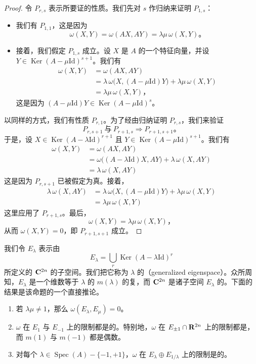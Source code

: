 \begin{proof}
令 $P_{r,s}$ 表示所要证的性质。我们先对 $s$ 作归纳来证明 $P_{1,s}$：
\begin{itemize}
\item 我们有 $P_{1,1}$，这是因为
\[
\omega(X,Y)=\omega(AX,AY)=\lambda\mu\,\omega(X,Y)\text{。}
\]
\item 接着，我们假定 $P_{1,s}$ 成立。设 $X$ 是 $A$ 的一个特征向量，并设 $Y\in\operatorname{Ker}(A-\mu\mathrm{Id})^{s+1}$。我们有
\[
\begin{aligned}
\omega(X,Y)&=\omega(AX,AY)\\
&=\lambda\,\omega\bigl(X,(A-\mu\mathrm{Id})Y\bigr)+\lambda\mu\,\omega(X,Y)\\
&=\lambda\mu\,\omega(X,Y)\text{，}
\end{aligned}
\]
这是因为 $(A-\mu\mathrm{Id})Y\in\operatorname{Ker}(A-\mu\mathrm{Id})^{s}$。
\end{itemize}
以同样的方式，我们有性质 $P_{r,1}$。为了经由归纳证明 $P_{r,s}$，我们来验证
\[
P_{r,s+1}\ \text{与}\ P_{r+1,s}\Longrightarrow P_{r+1,s+1}\text{。}
\]
于是，设 $X\in\operatorname{Ker}(A-\lambda\mathrm{Id})^{r+1}$ 且 $Y\in\operatorname{Ker}(A-\mu\mathrm{Id})^{s+1}$。我们有
\[
\begin{aligned}
\omega(X,Y)&=\omega(AX,AY)\\
&=\omega\bigl((A-\lambda\mathrm{Id})X,AY\bigr)+\lambda\,\omega(X,AY)\\
&=\lambda\,\omega(X,AY)
\end{aligned}
\]
这是因为 $P_{r,s+1}$ 已被假定为真。接着，
\[
\begin{aligned}
\lambda\,\omega(X,AY)
&=\lambda\,\omega\bigl(X,(A-\mu\mathrm{Id})Y\bigr)+\lambda\mu\,\omega(X,Y)\\
&=\lambda\mu\,\omega(X,Y)
\end{aligned}
\]
这里应用了 $P_{r+1,s}$。最后，
\[
\omega(X,Y)=\lambda\mu\,\omega(X,Y)\text{，}
\]
从而 $\omega(X,Y)=0$，即 $P_{r+1,s+1}$ 成立。
\end{proof}

我们令 $E_\lambda$ 表示由
\[
E_\lambda=\bigcup_{r}\operatorname{Ker}(A-\lambda\mathrm{Id})^{r}
\]
所定义的 $\mathbf{C}^{2n}$ 的子空间。我们把它称为 $\lambda$ 的\textbf{\trGeneralizedEigenspace}（generalized eigenspace）。众所周知，$E_\lambda$ 是一个维数等于\trEigenvalue{} $\lambda$ 的\trMultiplicity{} $m(\lambda)$ 的复\trVectorSpace，而 $\mathbf{C}^{2n}$ 是诸子空间 $E_\lambda$ 的\trDirectSum。下面的结果是该命题的一个直接推论。

\begin{corollary}\label{thm:sp-eigenspace-corollary}
\begin{enumerate}[label=(\arabic*)]
\item 若 $\lambda\mu\neq1$，那么 $\omega(E_\lambda,E_\mu)=0$。
\item $\omega$ 在 $E_1$ 与 $E_{-1}$ 上的限制都是\trNondegenerate{}的。特别地，$\omega$ 在 $E_{\pm1}\cap\mathbf{R}^{2n}$ 上的限制都是\trSymplecticForm，而\trMultiplicity{} $m(1)$ 与 $m(-1)$ 都是偶数。
\item 对每个 $\lambda\in\operatorname{Spec}(A)-\{-1,+1\}$，$\omega$ 在 $E_\lambda\oplus E_{1/\lambda}$ 上的限制是\trNondegenerate{}的。\noqed
\end{enumerate}
\end{corollary}


